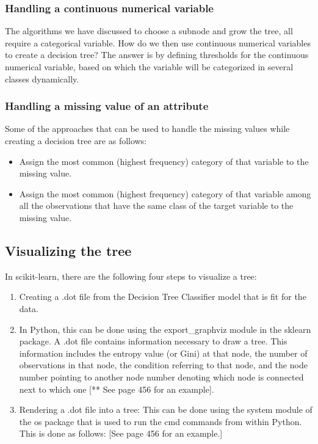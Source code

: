 \documentclass{article}
\numberwithin{equation}{section} %
\begin{document}
\subsubsection*{Handling a continuous numerical variable}

The algorithms we have discussed to choose a subnode and grow the tree, all require a categorical variable. How do we then use continuous numerical variables to create a decision tree? The answer is by defining thresholds for the continuous numerical variable, based on which the variable will be categorized in several classes dynamically.

\subsubsection*{Handling a missing value of an attribute}

Some of the approaches that can be used to handle the missing values while creating
a decision tree are as follows:

\begin{itemize}
	\item Assign the most common (highest frequency) category of that variable to
	the missing value.
	\item Assign the most common (highest frequency) category of that variable
	among all the observations that have the same class of the target variable
	to the missing value.
\end{itemize}


\subsection*{Visualizing the tree}

In scikit-learn, there are the following four steps to visualize a tree:

\begin{enumerate}
	\item Creating a .dot file from the Decision Tree Classifier model that is fit for the data.
	\item In Python, this can be done using the export\_graphviz module in the
	sklearn package. A .dot file contains information necessary to draw a tree. This information includes the entropy value (or Gini) at that node, the number of observations in that node, the condition referring to that node, and the node number pointing to another node number denoting which node is connected next to which one [** See page 456 for an example].
	\item Rendering a .dot file into a tree: 
	This can be done using the system module of the os package that is used to
	run the cmd commands from within Python. This is done as follows:
	[See page 456 for an example.]	
\end{enumerate}
\end{document}
